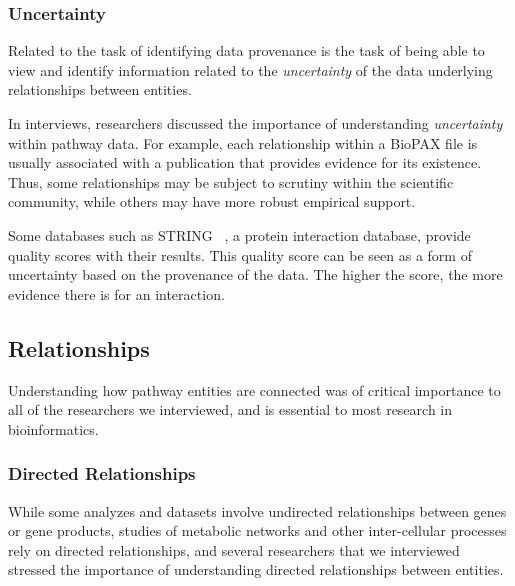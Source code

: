 \documentclass[journal]{vgtc}                %
\begin{document}
\subsubsection{Uncertainty}

Related to the task of identifying data provenance is the task of being able to view and identify information related to the \textit{uncertainty} of the data underlying relationships between entities.

In interviews, researchers discussed the importance of understanding \emph{uncertainty} within pathway data. For example, each relationship within a BioPAX file is usually associated with a publication that provides evidence for its existence. Thus, some relationships may be subject to scrutiny within the scientific community, while others may have more robust empirical support.

Some databases such as STRING~\cite{STRING2005} , a protein interaction database, provide quality scores with their results. This quality score can be seen as a form of uncertainty based on the provenance of the data.
The higher the score, the more evidence there is for an interaction.

\subsection{Relationships}

Understanding how pathway entities are connected was of critical importance to all of the researchers we interviewed, and is essential to most research in bioinformatics.

\subsubsection{Directed Relationships}

While some analyzes and datasets involve undirected relationships between genes or gene products, studies of metabolic networks and other inter-cellular processes rely on directed relationships, and several researchers that we interviewed stressed the importance of understanding directed relationships between entities.
\end{document}
